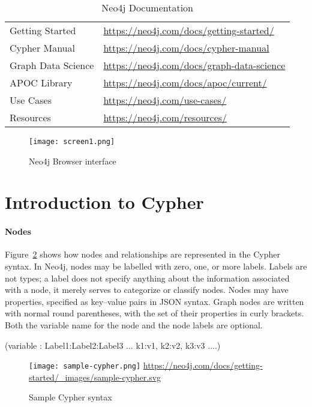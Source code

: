 \begin{table}
\renewcommand{\arraystretch}{1.5}
\centering
\small
\begin{tabular}{l|l} \hline
Getting Started & \url{https://neo4j.com/docs/getting-started/} \\ 
Cypher Manual & \url{https://neo4j.com/docs/cypher-manual} \\
Graph Data Science & \url{https://neo4j.com/docs/graph-data-science} \\ 
APOC Library & \url{https://neo4j.com/docs/apoc/current/} \\ 
Use Cases & \url{https://neo4j.com/use-cases/} \\
Resources & \url{https://neo4j.com/resources/} \\
\hline
\end{tabular}
\caption{Neo4j Documentation}
\label{tab:neo4jinfo}
\end{table}

\begin{figure}
\centering
\texttt{[image: screen1.png]}
\caption{Neo4j Browser interface}
\label{fig:neo4jbrowser}
\end{figure}

\section{Introduction to Cypher}

\paragraph*{Nodes}
Figure~\ref{fig:sample-cypher} shows how nodes and relationships are represented in the Cypher syntax. In Neo4j, nodes may be labelled with zero, one, or more labels. Labels are not types; a label does not specify anything about the information associated with a node, it merely serves to categorize or classify nodes. Nodes may have properties, specified as key--value pairs in JSON syntax. Graph nodes are written with normal round parentheses, with the set of their properties in curly brackets. Both the variable name for the node and the node labels are optional.

\begin{cyphercode}
(variable : Label1:Label2:Label3 ... {k1:v1, k2:v2, k3:v3 ....})
\end{cyphercode}


\begin{figure}
\centering
\texttt{[image: sample-cypher.png]}
\scriptsize{\url{https://neo4j.com/docs/getting-started/_images/sample-cypher.svg}}
\caption{Sample Cypher syntax}
\label{fig:sample-cypher}
\end{figure}

